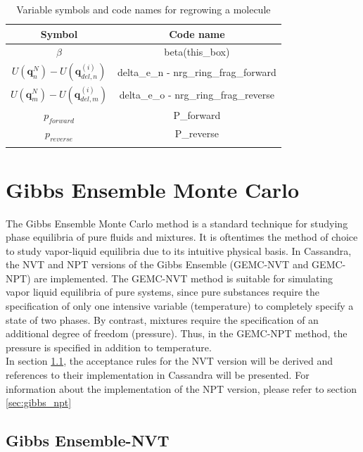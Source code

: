 \begin{table}
\caption{Variable symbols and code names for regrowing a molecule}
\label{table:cbmcRegrow}
\centering
\begin{tabular}{|c|c|} \hline
 {\bf Symbol} & {\bf Code name} \\ \hline
 $\beta$ & beta(this\_box) \\
 $U(\mathbf{q}^N_n) - U(\mathbf{q}^{(i)}_{del,n})$ & delta\_e\_n - nrg\_ring\_frag\_forward \\
 $U(\mathbf{q}^N_m) - U(\mathbf{q}^{(i)}_{del,m})$ & delta\_e\_o - nrg\_ring\_frag\_reverse \\
 $p_{forward}$ & P\_forward \\
 $p_{reverse}$ & P\_reverse \\
 \hline
\multicolumn{2}{c}{}
\end{tabular}
\end{table}

\section{Gibbs Ensemble Monte Carlo} 
\label{sec:gibbs}

The Gibbs Ensemble Monte Carlo method is a standard technique for studying phase equilibria of pure fluids
and mixtures. It is oftentimes the method of choice to study vapor-liquid equilibria due to its intuitive 
physical basis. 
In Cassandra, the NVT and NPT versions of the Gibbs Ensemble (GEMC-NVT and GEMC-NPT) are implemented. 
The GEMC-NVT method is suitable for simulating vapor liquid equilibria of pure systems, since
pure substances require the specification of only one intensive variable 
(temperature) to completely specify a state of two phases. 
By contrast, mixtures require the specification of an additional degree of freedom (pressure).
Thus, in the GEMC-NPT method, the pressure is specified in addition to temperature. \\

In section \ref{sec:gibbs_nvt}, the acceptance rules for the NVT version will be derived and 
references to their implementation in Cassandra will be
presented. For information about the implementation of the NPT version, 
please refer to section \ref{sec:gibbs_npt}

\subsection{Gibbs Ensemble-NVT}
\label{sec:gibbs_nvt}


